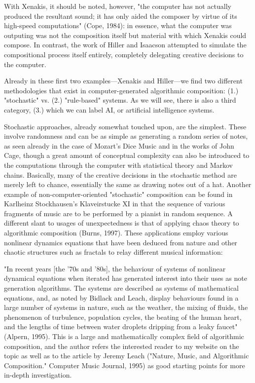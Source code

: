 \documentclass{automatextcc}
\begin{document}
With Xenakis, it should be noted, however, "the computer has not actually produced the resultant sound; it has only aided the composer by virtue of its high-speed computations" (Cope, 1984): in essence, what the computer was outputing was not the composition itself but material with which Xenakis could compose. In contrast, the work of Hiller and Isaacson attempted to simulate the compositional process itself entirely, completely delegating creative decisions to the computer.

Already in these first two examples—Xenakis and Hiller—we find two different methodologies that exist in computer-generated algorithmic composition: (1.) "stochastic" vs. (2.) "rule-based" systems. As we will see, there is also a third category, (3.) which we can label AI, or artificial intelligence systems.

Stochastic approaches, already somewhat touched upon, are the simplest. These involve randomness and can be as simple as generating a random series of notes, as seen already in the case of Mozart's Dice Music and in the works of John Cage, though a great amount of conceptual complexity can also be introduced to the computations through the computer with statistical theory and Markov chains. Basically, many of the creative decisions in the stochastic method are merely left to chance, essentially the same as drawing notes out of a hat. Another example of non-computer-oriented "stochastic" composition can be found in Karlheinz Stockhausen's Klaveirstucke XI in that the sequence of various fragments of music are to be performed by a pianist in random sequence. A different slant to usages of unexpectedness is that of applying chaos theory to algorithmic composition (Burns, 1997). These applications employ various nonlinear dynamics equations that have been deduced from nature and other chaotic structures such as fractals to relay different musical information:

"In recent years [the '70s and '80s], the behaviour of systems of nonlinear dynamical equations when iterated has generated interest into their uses as note generation algorithms. The systems are described as systems of mathematical equations, and, as noted by Bidlack and Leach, display behaviours found in a large number of systems in nature, such as the weather, the mixing of fluids, the phenomenon of turbulence, population cycles, the beating of the human heart, and the lengths of time between water droplets dripping from a leaky faucet" (Alpern, 1995).
This is a large and mathematically complex field of algorithmic composition, and the author refers the interested reader to my website on the topic as well as to the article by Jeremy Leach ("Nature, Music, and Algorithmic Composition." Computer Music Journal, 1995) as good starting points for more in-depth investigation.
\end{document}
